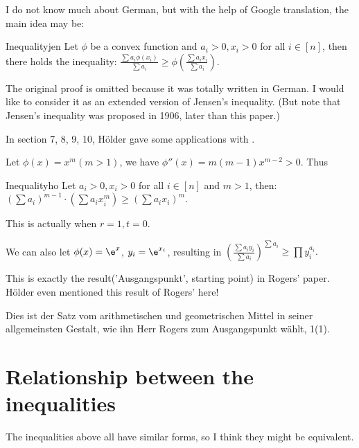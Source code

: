 I do not know much about German, but with the help of Google translation, the main idea may be:

\begin{thm}{Inequality}{jen}
    Let $\phi $ be a convex function and $a_i > 0,  x_i > 0$ for all $i \in [n]$, then there holds the inequality:
\begin{math}
    \frac{\sum a_i \phi (x_i)}{\sum a_i} \ge \phi (\frac{\sum a_i x_i}{\sum a_i})
.\end{math}
\end{thm}

The original proof is omitted because it was totally written in German. I would like to consider it as an extended version of Jensen's inequality. (But note that Jensen's inequality was proposed in 1906, later than this paper.)

In section 7, 8, 9, 10, Hölder gave some applications with .

Let $\phi (x) = x^m(m > 1)$, we have $\phi ''(x) = m(m-1)x^{m-2} > 0$. Thus
\begin{thm}{Inequality}{ho}
    Let $a_i > 0,  x_i > 0$ for all $i \in [n]$ and $m > 1$, then:
    \begin{math}
        (\sum a_i)^{m-1} \cdot (\sum a_i x_i^m) \ge (\sum a_i x_i)^m
    .\end{math}
\end{thm}

This is actually  when $r = 1, t = 0$.

We can also let $\phi (x) = \e^x$, $y_i = \e^{x_i}$, resulting in
\begin{math}
    (\frac{\sum a_i y_i}{\sum a_i})^{\sum a_i} \ge \prod y_i^{a_i}
.\end{math}

This is exactly the result('Ausgangspunkt', starting point) in Rogers' paper. Hölder even mentioned this result of Rogers' here!
\begin{qte}
    Dies ist der Satz vom arithmetischen und geometrischen Mittel in seiner allgemeinsten Gestalt, wie ihn Herr Rogers zum Ausgangspunkt wählt, 1(1).
\end{qte}

\section{Relationship between the inequalities}

The inequalities above all have similar forms, so I think they might be equivalent.


